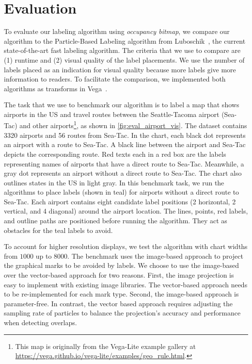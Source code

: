 \section{Evaluation}

To evaluate our labeling algorithm using \emph{occupancy bitmap}, we compare our algorithm to the Particle-Based Labeling algorithm from Luboschik~\ea \cite{luboschik:particle}, the current state-of-the-art fast labeling algorithm.
The criteria that we use to compare are (1) runtime and (2) visual quality of the label placements.
We use the number of labels placed as an indication for visual quality because more labels give more information to readers.
To facilitate the comparison, we implemented both algorithms as transforms in Vega~\cite{satyanarayan:vega}.

The task that we use to benchmark our algorithm is to label a map that shows airports in the US
and travel routes between the Seattle-Tacoma airport (Sea-Tac) and other airports\footnote{This map is originally from the Vega-Lite example gallery at \url{https://vega.github.io/vega-lite/examples/geo_rule.html}.}, as shown in \autoref{fig:eval_airport_vis}.
The dataset contains 3320 airports and 56 routes from Sea-Tac.
In the chart, each black dot represents an airport with a route to Sea-Tac.
A black line between the airport and Sea-Tac depicts the corresponding route.
Red texts each in a red box are the labels representing names of airports that have a direct route to Sea-Tac.
Meanwhile, a gray dot represents an airport without a direct route to Sea-Tac.
The chart also outlines states in the US in light gray.
In this benchmark task, we run the algorithms to place labels (shown in teal) for airports without a direct route to Sea-Tac.
Each airport contains eight candidate label positions (2 horizontal, 2 vertical, and 4 diagonal) around the airport location.
The lines, points, red labels, and outline paths are positioned before running the algorithm.
They act as obstacles for the teal labels to avoid.

To account for higher resolution displays, we test the algorithm with chart widths from $1000$ up to $8000$.
The benchmark uses the image-based approach to project the graphical marks to be avoided by labels.
We choose to use the image-based over the vector-based approach for two reasons.
First, the image projection is easy to implement with existing image libraries.
The vector-based approach needs to be re-implemented for each mark type.
Second, the image-based approach is parameter-free.
In contrast, the vector based approach requires adjusting the sampling rate of particles to balance the projection's accuracy and performance when detecting overlaps.

